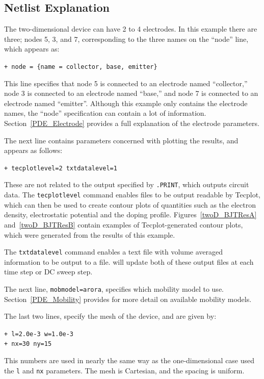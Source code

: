 \subsection{Netlist Explanation}
The two-dimensional device can have 2 to 4 electrodes.  In this example there
are three; nodes 5, 3, and 7, corresponding to the three names
on the ``node'' line,  which appears as:

\texttt{+ node = \{name = collector, base, emitter\} }

This line specifies that node 5 is connected to an electrode named 
``collector,'' node 3 is connected to an electrode named ``base,'' and node 7
is connected to an electrode named ``emitter''.    Although this example only
contains the electrode names, the ``node'' specification
can contain a lot of information. Section~\ref{PDE_Electrode} provides a full explanation of the
electrode parameters.  

The next line contains parameters concerned with plotting the results, and
appears as follows:

\texttt{+ tecplotlevel=2 txtdatalevel=1}

These are not related to the output specified by \texttt{.PRINT}, which outputs circuit data.  
The \texttt{tecplotlevel} command enables files to be output readable by Tecplot,  
which can then be used to create contour plots of 
quantities such as the electron density, electrostatic potential and the
doping profile.  Figures~\ref{twoD_BJTResA} and~\ref{twoD_BJTResB} 
contain examples of Tecplot-generated contour plots, which were generated
from the results of this example.

The \texttt{txtdatalevel} command enables a text file with volume averaged
information to be output to a file.  \Xyce{} will update both of 
these output files at each time step or DC sweep step.

The next line, \texttt{mobmodel=arora}, specifies which mobility model to
use.  Section~\ref{PDE_Mobility} provides for more detail on available mobility models.

The last two lines, specify the mesh of the device, and are given by:

\texttt{+ l=2.0e-3  w=1.0e-3} \\
\texttt{+ nx=30     ny=15}

This numbers are used in nearly the same way as the one-dimensional case used the \texttt{l} and
\texttt{nx} parameters.  The mesh is Cartesian, and the spacing is uniform.  

